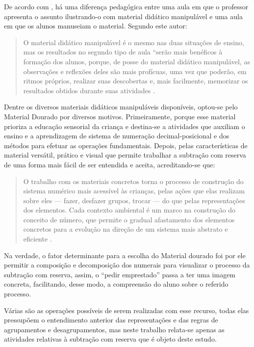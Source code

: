 \begin{refsection}
    De acordo com \textcite{LORENZATO2006Começar}, há uma diferença pedagógica entre uma aula em que o professor apresenta o assunto ilustrando-o com material didático manipulável e uma aula em que os alunos manuseiam o material. Segundo este autor: 

    \begin{quotation}
        O material didático manipulável é o mesmo nas duas situações de ensino, mas os resultados no segundo tipo de aula “serão mais benéficos à formação dos alunos, porque, de posse do material didático manipulável, as observações e reflexões deles são mais profícuas, uma vez que poderão, em ritmos próprios, realizar suas descobertas e, mais facilmente, memorizar os resultados obtidos durante suas atividades \cite[p.~27]{LORENZATO2006Começar}. 
    \end{quotation}

    Dentre os diversos materiais didáticos manipuláveis disponíveis, optou-se pelo Material Dourado por diversos motivos. Primeiramente, porque esse material prioriza a educação sensorial da criança e destina-se a atividades que auxiliam o ensino e a aprendizagem de sistema de numeração decimal-posicional e dos métodos para efetuar as operações fundamentais. Depois, pelas características de material versátil, prático e visual que permite trabalhar a subtração com reserva de uma forma mais fácil de ser entendida e aceita, acreditando-se que: 

    \begin{quotation}
        O trabalho com os materiais concretos torna o processo de construção do sistema numérico mais acessível às crianças, pelas ações que elas realizam sobre eles --- fazer, desfazer grupos, trocar --- do que pelas representações dos elementos. Cada contexto ambiental é um marco na construção do conceito de número, que permite o gradual afastamento dos elementos concretos para a evolução na direção de um sistema mais abstrato e eficiente \cite[p.~65]{GOLBERT1999Matemática}.
    \end{quotation}

    Na verdade, o fator determinante para a escolha do Material dourado foi por ele permitir a composição e decomposição dos numerais para visualizar o processo da subtração com reserva, assim, o “pedir emprestado” passa a ter uma imagem concreta, facilitando, desse modo, a compreensão do aluno sobre o referido processo. 

    Várias são as operações possíveis de serem realizadas com esse recurso, todas elas pressupõem o entendimento anterior das representações e das regras de agrupamentos e desagrupamentos, mas neste trabalho relata-se apenas as atividades relativas à subtração com reserva que é objeto deste estudo.


\end{refsection}
